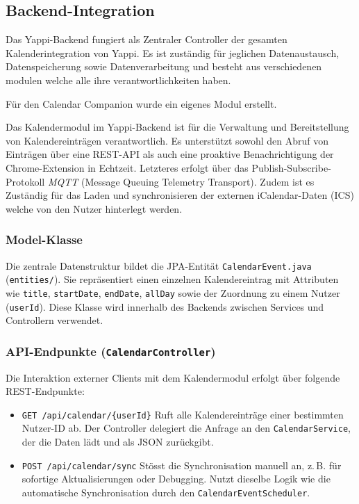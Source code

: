 \documentclass[12pt,a4paper]{report}
\begin{document}
\subsection{Backend-Integration}

        Das Yappi-Backend fungiert als Zentraler Controller der gesamten Kalenderintegration von Yappi.
        Es ist zuständig für jeglichen Datenaustausch, Datenspeicherung sowie Datenverarbeitung und besteht
        aus verschiedenen modulen welche alle ihre verantwortlichkeiten haben.

        Für den Calendar Companion wurde ein eigenes Modul erstellt.

        Das Kalendermodul im Yappi-Backend ist für die Verwaltung und Bereitstellung von Kalendereinträgen verantwortlich.
        Es unterstützt sowohl den Abruf von Einträgen über eine REST-API als auch eine proaktive Benachrichtigung der Chrome-Extension in Echtzeit.
        Letzteres erfolgt über das Publish-Subscribe-Protokoll \textit{MQTT} (Message Queuing Telemetry Transport).
        Zudem ist es Zuständig für das Laden und synchronisieren der externen iCalendar-Daten (ICS) welche von den Nutzer hinterlegt werden.


    \subsubsection{Model-Klasse}
        Die zentrale Datenstruktur bildet die JPA-Entität \texttt{CalendarEvent.java} (\texttt{entities/}).
        Sie repräsentiert einen einzelnen Kalendereintrag mit Attributen wie \texttt{title}, \texttt{startDate}, \texttt{endDate}, \texttt{allDay} sowie der Zuordnung zu einem Nutzer (\texttt{userId}).
        Diese Klasse wird innerhalb des Backends zwischen Services und Controllern verwendet.

    \subsubsection{API-Endpunkte (\texttt{CalendarController})}
        Die Interaktion externer Clients mit dem Kalendermodul erfolgt über folgende REST-Endpunkte:
        \begin{itemize}
            \item \texttt{GET /api/calendar/\{userId\}}
                Ruft alle Kalendereinträge einer bestimmten Nutzer-ID ab.
                Der Controller delegiert die Anfrage an den \texttt{CalendarService}, der die Daten lädt und als JSON zurückgibt.
            \item \texttt{POST /api/calendar/sync}
                Stösst die Synchronisation manuell an, z.\,B. für sofortige Aktualisierungen oder Debugging.
                Nutzt dieselbe Logik wie die automatische Synchronisation durch den \texttt{CalendarEventScheduler}.
        \end{itemize}
\end{document}
